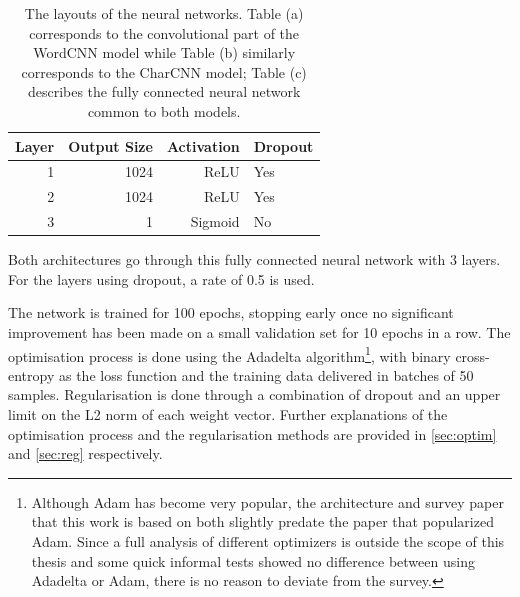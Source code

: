 \begin{table}[tb]
\begin{subtable}[t]{\textwidth}
    \centering
    \begin{tabular}{rrrl}
      \toprule
      Layer & Output Size & Activation & Dropout \\
      \midrule
      1 & 1024 & ReLU & Yes \\
      2 & 1024 & ReLU & Yes \\
      3 & 1 & Sigmoid & No \\
      \bottomrule
    \end{tabular}
    \caption{Both architectures go through this fully connected neural network
    with 3 layers. For the layers using dropout, a rate of 0.5 is used.
    \label{tbl:fully_connnected}}
  \end{subtable}
  \caption{The layouts of the neural networks. Table (a) corresponds to the
  convolutional part of the WordCNN model while Table (b) similarly corresponds
  to the CharCNN model; Table (c) describes the fully connected neural network
  common to both models.\label{tbl:conv_layers}}
\end{table}

The network is trained for 100 epochs, stopping early once no significant
improvement has been made on a small validation set for 10 epochs in a row.
The optimisation process is done using the Adadelta\citep{adadelta}
algorithm\footnote{Although Adam\citep{adam} has become very popular, the
architecture\citep{kim2014conv} and survey paper\citep{zhang2015conv} that
this work is based on both slightly predate the paper that popularized Adam.
Since a full analysis of different optimizers is outside the scope of this
thesis and some quick informal tests showed no difference between using
Adadelta or Adam, there is no reason to deviate from the survey.}, with binary
cross-entropy as the loss function and the training data delivered in batches
of 50 samples. Regularisation is done through a combination of
dropout\citep{dropout} and an upper limit on the L2 norm of each weight
vector\citep{l2norm}. Further explanations of the optimisation process and the
regularisation methods are provided in \cref{sec:optim} and \cref{sec:reg}
respectively.

